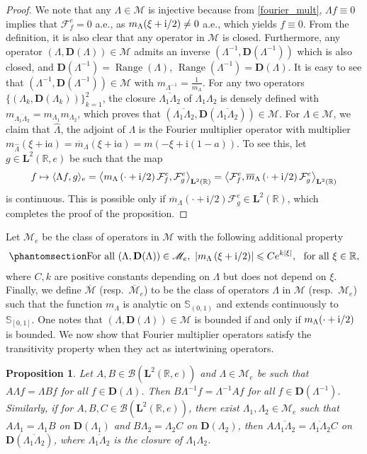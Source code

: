 \documentclass[12pt]{amsart}
\newcommand{\hlabel}{\phantomsection\label}
\numberwithin{equation}{section}
\newcommand{\bb}{\mathbb}
\newcommand{\cc}{\mathcal}
\renewcommand{\le}{\leqslant}
\newcommand{\hpt}[2]{#2}
\newcommand{\ov}{\overline}
\newcommand{\bmrm}[2][2]{\mathbf{#2}^{#1}}
\newcommand{\Range}{\operatorname{Range}}
\newcommand{\fouho}{\cc{F}^{e}}
\newcommand{\D}{\mathbf{D}}
\newcommand{\LL}{\Lambda}
\renewcommand{\i}{\mathrm{i}}
\newtheorem{prop}[thm]{Proposition}
\theoremstyle{definition}
\theoremstyle{assump}
\theoremstyle{remark}
\begin{document}
\begin{proof}
We note that any $\LL\in\mathscr{M}$ is injective because from \eqref{fourier_mult}, $\LL f\equiv 0$ implies that $\fouho_{f}=0$ a.e., as $m_{\LL}(\xi+{\rm{i}}/2)\neq 0$ a.e., which yields $f\equiv 0$. From the definition, it is also clear that any operator in $\mathscr{M}$ is closed. Furthermore, any operator $(\LL,\D(\LL))\in\mathscr{M}$ admits an inverse $(\LL^{-1},\D(\LL^{-1}))$ which is also closed, and $\D(\LL^{-1})=\Range(\LL)$, $\Range(\LL^{-1})=\D(\LL)$. It is easy to see that $(\LL^{-1},\D(\LL^{-1}))\in\mathscr{M}$ with $m_{\LL^{-1}}=\frac{1}{m_{\LL}}$. For any two operators $\{(\LL_k,\D(\LL_k))\}_{k=1}^2$, \hpt{R13}{the closure $\ov{\LL_1\LL_2}$} of $\Lambda_1\Lambda_2$ is densely defined with $m_{\ov{\LL_1\LL_2}}=m_{\LL_1}m_{\LL_2}$, which proves that $(\ov{\LL_1\LL_2},\D(\ov{\LL_1\LL_2}))\in\mathscr{M}$. For $\LL\in\mathscr{M}$, we claim that $\widehat{\LL}$, the adjoint of $\LL$ is the Fourier multiplier operator with  multiplier  \hpt{C22}{$m_{\widehat{\LL}}(\xi+\i a)=\ov{m}_{\LL}(\xi+\i a)=m(-\xi+\i(1-a))$}. To see this, let $g\in\bmrm{L}(\bb{R},e)$ be such that the map
$$f\mapsto\langle \LL f, g\rangle_e=\left\langle m_{\LL}\left(\cdot+{\rm{i}}/2\right)\fouho_f, \fouho_g\right\rangle_{\bmrm{L}(\bb{R})}=\left\langle\fouho_f,\ov{m}_{\LL}\left(\cdot+{\rm{i}}/2\right)\fouho_g\right\rangle_{\bmrm{L}(\bb{R})}$$ is continuous. This is possible only if $\overline{m}_{\LL}\left(\cdot+{\i/2}\right)\fouho_g\in\bmrm{L}(\bb{R})$, which completes the proof of the proposition.
\end{proof}
Let $\mathscr{M}_e$ be the class of operators in $\mathscr{M}$ with the following additional property
\begin{align}\hlabel{eq:mult_strip}
\mbox{For all} \ (\LL,\D(\LL))\in\mathscr{M}_e, \ \left|m_{\LL}\left(\xi+{\rm{i}}/2\right)\right|\le Ce^{k|\xi|}, \  \mbox{ for all } \xi\in\bb R,
\end{align}
where $C,k$ are positive constants depending on $\LL$ but does not depend on $\xi$. Finally, we define $\overline{\mathscr{M}}$ (resp.~$\overline{\mathscr{M}}_e$) to be the class of operators $\LL$ in $\mathscr{M}$ (resp.~$\mathscr{M}_e$) such that the function $m_{\LL}$ is analytic on $\bb{S}_{(0,1)}$ and extends continuously to $\bb{S}_{[0,1]}$. One  notes that $(\LL,\D(\LL))\in\mathscr{M}$ is bounded if and only if $m_{\LL}(\cdot+{\rm{i}}/2)$ is bounded. We now show that Fourier multiplier operators satisfy the transitivity property when they act as intertwining operators.
\begin{prop}\hlabel{intertwining_equiv} Let $A,B\in\mathscr{B}(\bmrm{L}(\bb{R},e))$ and $\Lambda\in\mathscr{M}_e$ be such that $A\Lambda f=\Lambda Bf$ for all $f\in\D(\Lambda)$. Then $B\Lambda^{-1} f=\Lambda^{-1} Af$ for all $f\in\D(\Lambda^{-1})$. Similarly, if for $A,B,C\in\mathscr{B}(\bmrm{L}(\bb{R},e))$, there exist $\Lambda_1,\Lambda_2\in\mathscr{M}_e$ such that $A\Lambda_1=\Lambda_1 B$ on $\D(\Lambda_1)$ and $B\Lambda_2=\Lambda_2 C$ on $\D(\Lambda_2)$, then $A\ov{\Lambda_1\Lambda_2}=\ov{\Lambda_1\Lambda_2} \hpt{R15}{C}$ on $\D(\ov{\Lambda_1\Lambda_2})$, where $\ov{\Lambda_1\Lambda_2}$ is the closure of $\Lambda_1\Lambda_2$.
\end{prop}
\end{document}
